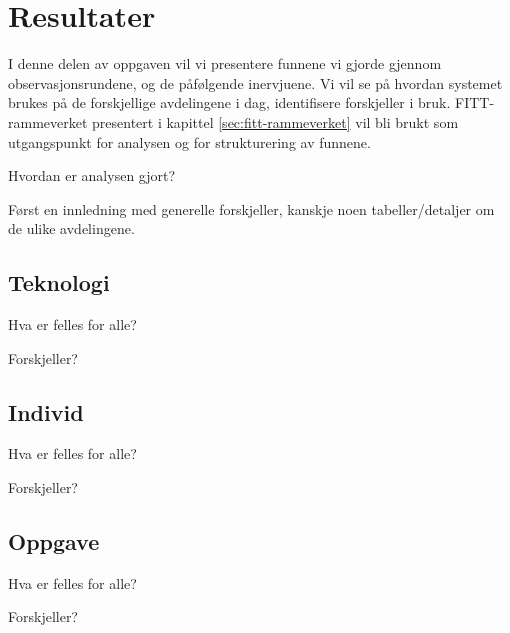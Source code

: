 \chapter{Resultater}
\label{chp:resultater} 

I denne delen av oppgaven vil vi presentere funnene vi gjorde gjennom observasjonsrundene, og de påfølgende inervjuene. Vi vil se på hvordan systemet brukes på de forskjellige avdelingene i dag, identifisere forskjeller i bruk. FITT-rammeverket presentert i kapittel \ref{sec:fitt-rammeverket} vil bli brukt som utgangspunkt for analysen og for strukturering av funnene.

\noindent
Hvordan er analysen gjort?

\noindent
Først en innledning med generelle forskjeller, kanskje noen tabeller/detaljer om de ulike avdelingene.

\section{Teknologi}
Hva er felles for alle?

Forskjeller?

\section{Individ}
Hva er felles for alle?

Forskjeller?

\section{Oppgave}
Hva er felles for alle?

Forskjeller?
 



